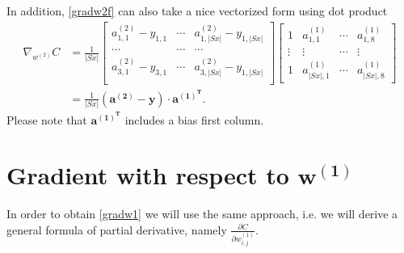 \documentclass[a4paper,12pt,notitlepage]{article}
\begin{document}
In addition, \eqref{gradw2f} can also take a nice vectorized form using dot product
\begin{equation} \label{gradw2f2}
\begin{split}
\nabla_{w^{(2)}}C&=\frac{1}{|Sx|}\begin{bmatrix}
 a_{1,1}^{(2)}-y_{1,1}& \cdots &a_{1,|Sx|}^{(2)}-y_{1,|Sx|} \\ 
 \cdots& \cdots &\cdots \\
 a_{3,1}^{(2)}-y_{3,1}& \cdots &a_{3,|Sx|}^{(2)}-y_{1,|Sx|} \\
\end{bmatrix}\begin{bmatrix}
 1& a_{1,1}^{(1)} & \cdots &a_{1,8}^{(1)} \\ 
 \vdots& \vdots & \cdots & \vdots \\ 
 1& a_{|Sx|,1}^{(1)} & \cdots  & a_{|Sx|,8}^{(1)}
\end{bmatrix}\\
&=\frac{1}{|Sx|}(\mathbf{a^{(2)}}-\mathbf{y})\cdot\mathbf{a^{(1)^{T}}}.
\end{split}
\end{equation}
Please note that $\mathbf{a^{(1)^{T}}}$ includes a bias first column.
\newpage 
\section*{Gradient with respect to $\mathbf{w^{(1)}}$}
In order to obtain \eqref{gradw1} we will use the same approach, i.e. we will derive a general formula of partial derivative, namely $\frac{\partial C}{\partial w_{i,j}^{(1)}}$.
\end{document}
